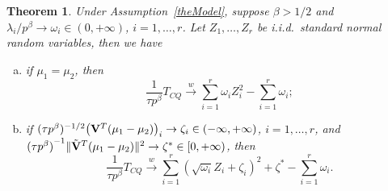 \documentclass[3p]{elsarticle}
\theoremstyle{plain}
\newtheorem{theorem}{\quad\quad Theorem}
\theoremstyle{definition}
\theoremstyle{remark}
\begin{document}
\begin{theorem}\label{Chenstheory2}
 Under Assumption~\ref{theModel},
    suppose $\beta>1/2$ and $\lambda_i/p^\beta \to \omega_i\in(0,+\infty)$, $i=1,\ldots,r$.
    Let $Z_1,\ldots,Z_{r}$ be i.i.d.\ standard normal random variables,
     then we have
     \begin{enumerate}[(a)]
         \item
             if $\mu_1=\mu_2$, then
    $$
        \frac{1}{\tau p^{\beta}} T_{CQ}
        \xrightarrow{w}
        \sum_{i=1}^r \omega_i Z_i^2
            -
        \sum_{i=1}^r \omega_i;
    $$
         \item
             if $(\tau p^{\beta})^{-1/2}\big(\mathbf{V}^T (\mu_1-\mu_2)\big)_i\to \zeta_i\in(-\infty,+\infty)$, $i=1,\ldots,r$,
             and
    ${(\tau p^\beta)}^{-1}\|\tilde{\mathbf{V}}^T (\mu_1-\mu_2)\|^2\to \zeta^*\in [0,+\infty)$, then
    $$
        \frac{1}{\tau p^{\beta}} T_{CQ}
        \xrightarrow{w}
        \sum_{i=1}^r (\sqrt{\omega_i} Z_i+\zeta_i)^2+
\zeta^*
        -
        \sum_{i=1}^r \omega_i.
    $$
     \end{enumerate}
\end{theorem}
\end{document}
